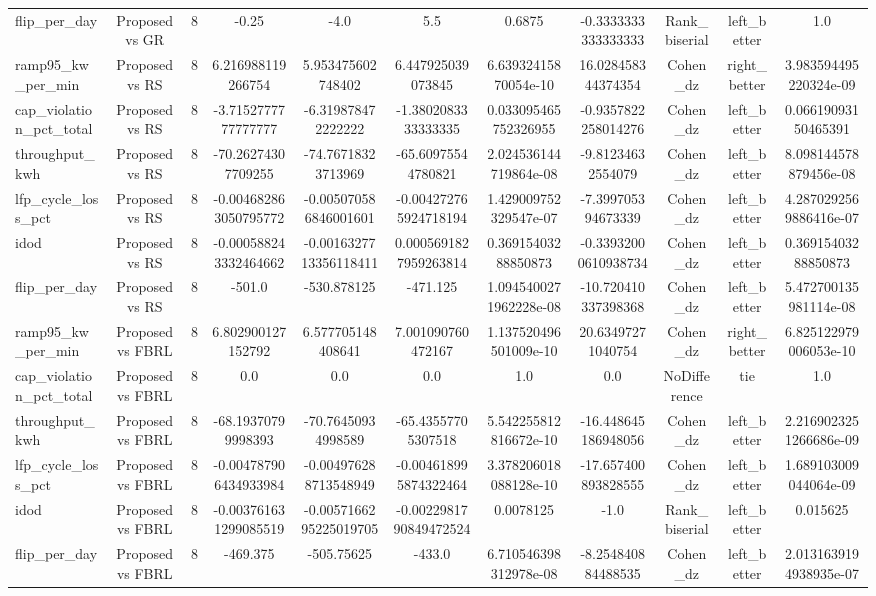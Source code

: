 \begin{table}[t]
\begin{tabular}{lcccccccccc}
flip\_per\_day & Proposed vs GR & 8 & -0.25 & -4.0 & 5.5 & 0.6875 & -0.3333333333333333 & Rank\_biserial & left\_better & 1.0 \\
ramp95\_kw\_per\_min & Proposed vs RS & 8 & 6.216988119266754 & 5.953475602748402 & 6.447925039073845 & 6.63932415870054e-10 & 16.028458344374354 & Cohen\_dz & right\_better & 3.983594495220324e-09 \\
cap\_violation\_pct\_total & Proposed vs RS & 8 & -3.7152777777777777 & -6.319878472222222 & -1.3802083333333335 & 0.033095465752326955 & -0.9357822258014276 & Cohen\_dz & left\_better & 0.06619093150465391 \\
throughput\_kwh & Proposed vs RS & 8 & -70.26274307709255 & -74.76718323713969 & -65.60975544780821 & 2.024536144719864e-08 & -9.81234632554079 & Cohen\_dz & left\_better & 8.098144578879456e-08 \\
lfp\_cycle\_loss\_pct & Proposed vs RS & 8 & -0.004682863050795772 & -0.005070586846001601 & -0.004272765924718194 & 1.429009752329547e-07 & -7.399705394673339 & Cohen\_dz & left\_better & 4.2870292569886416e-07 \\
idod & Proposed vs RS & 8 & -0.000588243332464662 & -0.0016327713356118411 & 0.0005691827959263814 & 0.36915403288850873 & -0.33932000610938734 & Cohen\_dz & left\_better & 0.36915403288850873 \\
flip\_per\_day & Proposed vs RS & 8 & -501.0 & -530.878125 & -471.125 & 1.0945400271962228e-08 & -10.720410337398368 & Cohen\_dz & left\_better & 5.472700135981114e-08 \\
ramp95\_kw\_per\_min & Proposed vs FBRL & 8 & 6.802900127152792 & 6.577705148408641 & 7.001090760472167 & 1.137520496501009e-10 & 20.63497271040754 & Cohen\_dz & right\_better & 6.825122979006053e-10 \\
cap\_violation\_pct\_total & Proposed vs FBRL & 8 & 0.0 & 0.0 & 0.0 & 1.0 & 0.0 & NoDifference & tie & 1.0 \\
throughput\_kwh & Proposed vs FBRL & 8 & -68.19370799998393 & -70.76450934998589 & -65.43557705307518 & 5.542255812816672e-10 & -16.448645186948056 & Cohen\_dz & left\_better & 2.2169023251266686e-09 \\
lfp\_cycle\_loss\_pct & Proposed vs FBRL & 8 & -0.004787906434933984 & -0.004976288713548949 & -0.004618995874322464 & 3.378206018088128e-10 & -17.657400893828555 & Cohen\_dz & left\_better & 1.689103009044064e-09 \\
idod & Proposed vs FBRL & 8 & -0.003761631299085519 & -0.0057166295225019705 & -0.0022981790849472524 & 0.0078125 & -1.0 & Rank\_biserial & left\_better & 0.015625 \\
flip\_per\_day & Proposed vs FBRL & 8 & -469.375 & -505.75625 & -433.0 & 6.710546398312978e-08 & -8.254840884488535 & Cohen\_dz & left\_better & 2.0131639194938935e-07 \\
\bottomrule
\end{tabular}
\end{table}